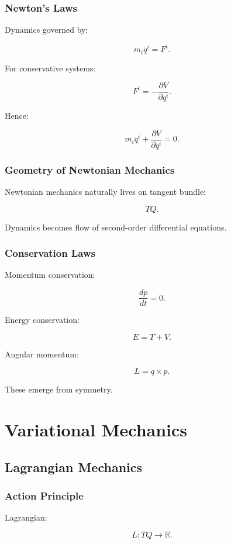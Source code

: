 \documentclass[11pt]{book}
\begin{document}
\section{Newton's Laws}

Dynamics governed by:

\[
m_i \ddot q^i = F^i.
\]

For conservative systems:

\[
F^i = -\frac{\partial V}{\partial q^i}.
\]

Hence:

\[
m_i \ddot q^i
+
\frac{\partial V}{\partial q^i}
=0.
\]

\section{Geometry of Newtonian Mechanics}

Newtonian mechanics naturally lives on tangent bundle:

\[
TQ.
\]

Dynamics becomes flow of second-order differential equations.

\section{Conservation Laws}

Momentum conservation:

\[
\frac{dp}{dt}=0.
\]

Energy conservation:

\[
E=T+V.
\]

Angular momentum:

\[
L=q\times p.
\]

These emerge from symmetry.

\part{Variational Mechanics}

\chapter{Lagrangian Mechanics}

\section{Action Principle}

Lagrangian:

\[
L:TQ\to\mathbb R.
\]
\end{document}

